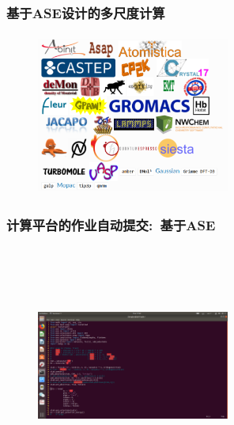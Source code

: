 \documentclass[cjk,slidestop,handout,compress,mathserif,blue]{beamer}	%
\begin{document}
%
\frame
{
	\frametitle{\textrm{基于ASE设计的多尺度计算}}
\begin{figure}[h!]
\centering
\vspace*{-0.2in}
\includegraphics[height=2.1in,width=2.5in,viewport=0 0 638 530,clip]{Figures/ASE_calculator.png}
\caption{\fontsize{7.2pt}{4.2pt}}%
\label{Logo_QM-MM}
\end{figure} 
}

\frame
{
	\frametitle{\textrm{计算平台的作业自动提交:~基于\textrm{ASE}}}
\begin{figure}[h!]
\centering
\vspace*{-0.2in}
\includegraphics[height=3.1in,width=2.5in,viewport=75 0 725 820,clip]{Figures/ASE_app.png}
\label{ASE_app}
\end{figure} 
}
\end{document}
